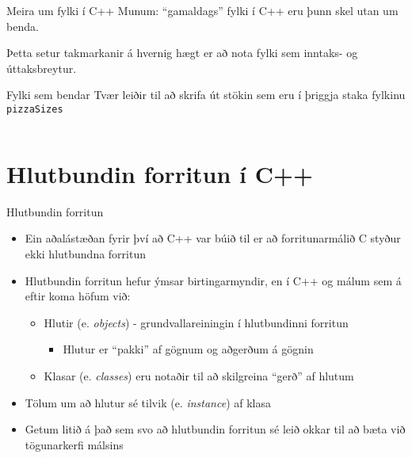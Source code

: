 \documentclass[handout]{beamer}
\begin{document}
\begin{frame}{Meira um fylki í C++}
Munum: ``gamaldags'' fylki í C++ eru þunn skel utan um benda.

Þetta setur takmarkanir á hvernig hægt er að nota fylki sem inntaks- og úttaksbreytur.
\end{frame}

\begin{frame}{Fylki sem bendar}
Tvær leiðir til að skrifa út stökin sem eru í þriggja staka fylkinu \texttt{pizzaSizes}
\begin{columns}
\end{columns}
\end{frame}

\section{Hlutbundin forritun í C++}

\begin{frame}{Hlutbundin forritun}
\begin{itemize}
 \item Ein aðalástæðan fyrir því að C++ var búið til er að forritunarmálið C styður ekki hlutbundna forritun
 \item Hlutbundin forritun hefur ýmsar birtingarmyndir, en í C++ og málum sem á eftir koma höfum við:
 \begin{itemize}
  \item Hlutir (e. \emph{objects}) - grundvallareiningin í hlutbundinni forritun
  \begin{itemize}
   \item Hlutur er ``pakki'' af gögnum og aðgerðum á gögnin
  \end{itemize}
  \item Klasar (e. \emph{classes}) eru notaðir til að skilgreina ``gerð'' af hlutum 
 \end{itemize}
 \item Tölum um að hlutur sé tilvik (e. \emph{instance}) af klasa
 \item Getum litið á það sem svo að hlutbundin forritun sé leið okkar til að bæta við tögunarkerfi málsins
\end{itemize}
\end{frame}
\end{document}
